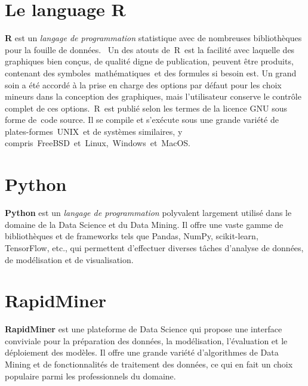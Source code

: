 \documentclass[a4paper,12pt]{report}
\begin{document}
    \section{Le language R}
    \textbf{R} est un \emph{langage de programmation} statistique avec de nombreuses bibliothèques pour la fouille de données.  Un des atouts de R est la facilité avec laquelle des graphiques bien conçus, de qualité digne de publication, peuvent être produits, contenant des symboles mathématiques et des formules si besoin est. Un grand soin a été accordé à la prise en charge des options par défaut pour les choix mineurs dans la conception des graphiques, mais l'utilisateur conserve le contrôle complet de ces options. R est publié selon les termes de la licence GNU sous forme de code source. Il se compile et s'exécute sous une grande variété de plates-formes UNIX et de systèmes similaires, y compris FreeBSD et Linux, Windows et MacOS.
    
    \section{Python}
    \textbf{Python} est un \emph{langage de programmation} polyvalent largement utilisé dans le domaine de la Data Science et du Data Mining. Il offre une vaste gamme de bibliothèques et de frameworks tels que Pandas, NumPy, scikit-learn, TensorFlow, etc., qui permettent d’effectuer diverses tâches d’analyse de données, de modélisation et de visualisation.

    \section{RapidMiner}
    \textbf{RapidMiner} est une plateforme de Data Science qui propose une interface conviviale pour la préparation des données, la modélisation, l’évaluation et le déploiement des modèles. Il offre une grande variété d’algorithmes de Data Mining et de fonctionnalités de traitement des données, ce qui en fait un choix populaire parmi les professionnels du domaine.

    
\end{document}
